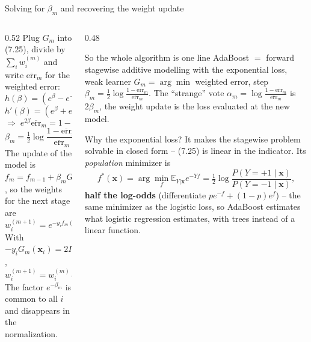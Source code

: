 \documentclass[10pt,aspectratio=169]{beamer}
\newcommand{\err}{\overline{\mathrm{err}}}
\begin{document}
\begin{frame}{Solving for $\beta_m$ and recovering the weight update}
\begin{columns}[T]
\begin{column}{0.52\textwidth}
\footnotesize
Plug $G_m$ into (7.25), divide by $\sum_iw_i^{(m)}$ and write
$\err_m$ for the weighted error:
\[
h(\beta)=(e^{\beta}-e^{-\beta})\,\err_m+e^{-\beta}.
\]
\[
h'(\beta)=(e^{\beta}+e^{-\beta})\,\err_m-e^{-\beta}=0
\]
\[
\Longrightarrow\;e^{2\beta}\err_m=1-\err_m ,
\]
\[
\beta_m=\tfrac12\log\frac{1-\err_m}{\err_m}.\tag{7.27}
\]
The update of the model is $f_m=f_{m-1}+\beta_mG_m$, so the weights for the
next stage are
\[
w_i^{(m+1)}=e^{-y_if_m(\bm{x}_i)}=w_i^{(m)}\,e^{-\beta_my_iG_m(\bm{x}_i)} .
\]
With $-y_iG_m(\bm{x}_i)=2I(y_i\neq G_m(\bm{x}_i))-1$,
\[
w_i^{(m+1)}=w_i^{(m)}\,e^{\alpha_mI(y_i\neq G_m(\bm{x}_i))}\,e^{-\beta_m},
\qquad\alpha_m=2\beta_m .\tag{7.28, 7.29}
\]
The factor $e^{-\beta_m}$ is common to all $i$ and disappears in the normalization.
\end{column}
\begin{column}{0.48\textwidth}
\begin{block}{So the whole algorithm is one line}
\footnotesize
AdaBoost $=$ forward stagewise additive modelling with the exponential loss,
weak learner $G_m=\arg\min$ weighted error, step $\beta_m=\frac12\log\frac{1-\err_m}{\err_m}$.
The ``strange'' vote $\alpha_m=\log\frac{1-\err_m}{\err_m}$ is $2\beta_m$,
the weight update is the loss evaluated at the new model.
\end{block}
\begin{block}{Why the exponential loss?}
\footnotesize
It makes the stagewise problem solvable in closed form -- (7.25) is linear
in the indicator.  Its \emph{population} minimizer is
\[
f^*(\bm{x})=\arg\min_f\mathbb{E}_{Y|\bm{x}}e^{-Yf}
=\tfrac12\log\frac{P(Y=+1\mid\bm{x})}{P(Y=-1\mid\bm{x})},
\]
\textbf{half the log-odds} (differentiate $pe^{-f}+(1-p)e^{f}$) -- the same
minimizer as the logistic loss, so AdaBoost estimates what logistic
regression estimates, with trees instead of a linear function.
\end{block}
\end{column}
\end{columns}
\end{frame}
\end{document}
